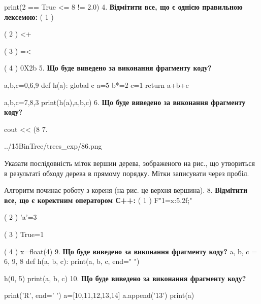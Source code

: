 \documentclass[11pt]{article}
\begin{document}
print(2 == True <= 8 != 2.0)
\vspace{5mm}
4. %
\textbf{Відмітити все, що є однією правильною лексемою:}
( 1 ) {

( 2 ) <+

( 3 ) =<

( 4 ) 0X2b
\vspace{5mm}
5. \textbf{Що буде виведено за виконання фрагменту коду?}

a,b,c=0,6,9
def h(a):
global c    a=5
    b*=2
    c=1
    return a+b+c

a,b,c=7,8,3
print(h(a),a,b,c)
\vspace{5mm}
6. \textbf{Що буде виведено за виконання фрагменту коду?}

cout << (8 %
\vspace{5mm}
7. 

\begin{center}
	{../15BinTree/trees_exp/86.png}
\end{center}
Указати послідовність міток вершин дерева, зображеного на рис., що утвориться в результаті обходу дерева в прямому порядку. Мітки записувати через пробіл.\par Алгоритм починає роботу з кореня (на рис. це верхня вершина).
\vspace{5mm}
8. %
\textbf{Відмітити все, що є коректним оператором С++:}
( 1 ) F"1={x:5.2f};"

( 2 ) 'a'=3

( 3 ) True=1

( 4 ) x=float(4)
\vspace{5mm}
9. \textbf{Що буде виведено за виконання фрагменту коду?}
a, b, c = 6, 9, 8
def h(a, b, c):
    print(a, b, c, end=" ")

h(0, 5)
print(a, b, c)
\vspace{5mm}
10. \textbf{Що буде виведено за виконання фрагменту коду?}

print('R', end=' ')
a=[10,11,12,13,14]
a.append('13')
print(a)

\vspace{5mm}










}
\end{document}
